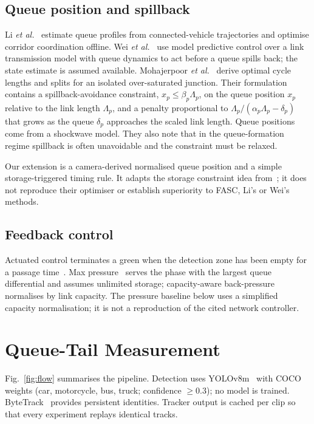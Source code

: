 \documentclass[conference]{IEEEtran}
\begin{document}
\subsection{Queue position and spillback}
Li \emph{et al.}~\cite{li2025} estimate queue profiles from connected-vehicle
trajectories and optimise corridor coordination offline. Wei \emph{et
al.}~\cite{wei2025} use model predictive control over a link transmission model with
queue dynamics to act before a queue spills back; the state estimate is assumed
available. Mohajerpoor \emph{et al.}~\cite{mohajerpoor2023} derive optimal cycle lengths
and splits for an isolated over-saturated junction. Their formulation contains a
spillback-avoidance constraint, $x_p \le \beta_p \Lambda_p$, on the queue position
$x_p$ relative to the link length $\Lambda_p$, and a penalty proportional to
$\Lambda_p/(\alpha_p\Lambda_p-\delta_p)$ that grows as the queue $\delta_p$ approaches the
scaled link length. Queue positions come from a shockwave model. They also note that in
the queue-formation regime spillback is often unavoidable and the constraint must be
relaxed.

\noindent Our extension is a camera-derived normalised queue position and a simple
storage-triggered timing rule. It adapts the storage constraint idea
from~\cite{mohajerpoor2023}; it does not reproduce their optimiser or establish
superiority to FASC, Li's or Wei's methods.

\subsection{Feedback control}
Actuated control terminates a green when the detection zone has been empty for a passage
time~\cite{stm2015}. Max pressure~\cite{varaiya2013} serves the phase with the largest
queue differential and assumes unlimited storage; capacity-aware back-pressure
\cite{gregoire2015} normalises by link capacity. The pressure baseline below uses a simplified capacity normalisation; it is not a reproduction of the cited network controller.

\section{Queue-Tail Measurement}\label{sec:measure}
Fig.~\ref{fig:flow} summarises the pipeline. Detection uses YOLOv8m~\cite{yolov8} with
COCO weights (car, motorcycle, bus, truck; confidence $\ge 0.3$); no model is trained.
ByteTrack~\cite{bytetrack} provides persistent identities. Tracker output is cached per
clip so that every experiment replays identical tracks.
\end{document}
